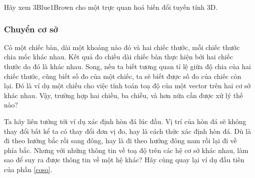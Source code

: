 Hãy xem 3Blue1Brown cho một trực quan hoá biến đổi tuyến tính 3D.
\subsubsection*{Chuyển cơ sở}
Có một chiếc bàn, dài một khoảng nào đó và hai chiếc thước, mỗi chiếc thước chia mốc khác nhau. Kết quả đo chiều dài chiếc bàn thực hiện bởi hai chiếc thước do đó là khác nhau. 
Song, nếu ta biết tương quan tỉ lệ giữa độ chia của hai chiếc thước, cũng biết số đo của một chiếc, ta sẽ biết được số đo của chiếc còn lại. Đó là ví dụ một chiều cho việc tính toán toạ độ
của một vector trên hai cơ sở khác nhau. Vậy, trường hợp hai chiều, ba chiều, và hơn nữa cần được xử lý thế nào? 
\vspace{8pt}

Ta hãy liên tưởng tới ví dụ xác định hòn đá lúc đầu. Vị trí của hòn đá sẽ không thay đổi bất kể ta có thay đổi đơn vị đo, hay là cách thức xác định hòn đá. Dù là đi theo hướng bắc rồi sang đông, hay là đi theo hướng đông nam rồi lại đi về phía bắc. 
Nhưng với những thông tin về toạ độ trên các hệ cơ sở khác nhau, làm sao để suy ra được thông tin về một hệ khác? Hãy cùng quay lại ví dụ đầu tiên của phần \ref{coso}.
\vspace{8pt}

